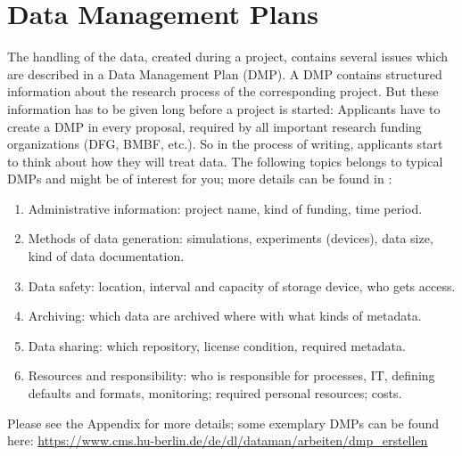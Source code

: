 \section{Data Management Plans}

The handling of the data, created during a project, contains several issues
which are described in a Data Management Plan (DMP). A DMP contains structured
information about the research process of the corresponding project. But these
information has to be given long before a project is started: Applicants have
to create a DMP in every proposal, required by all important research funding
organizations (DFG, BMBF, etc.). So in the process of writing, applicants start
to think about how they will treat data. The following topics belongs to typical
DMPs and might be of interest for you; more details can be found in
\cite{dfg2021,hannover2020}:
\begin{enumerate}
  \item Administrative information: project name, kind of funding, time period.
  \item Methods of data generation: simulations, experiments (devices),
        data size, kind of data documentation.
  \item Data safety: location, interval and capacity of storage device,
        who gets access.
  \item Archiving: which data are archived where with what kinds of metadata.
  \item Data sharing: which repository, license condition, required metadata.
  \item Resources and responsibility: who is responsible for processes, IT,
        defining defaults and formats, monitoring; required personal resources;
        costs.
\end{enumerate}
Please see the Appendix for more details; some exemplary DMPs can be found here:
\url{https://www.cms.hu-berlin.de/de/dl/dataman/arbeiten/dmp_erstellen}
